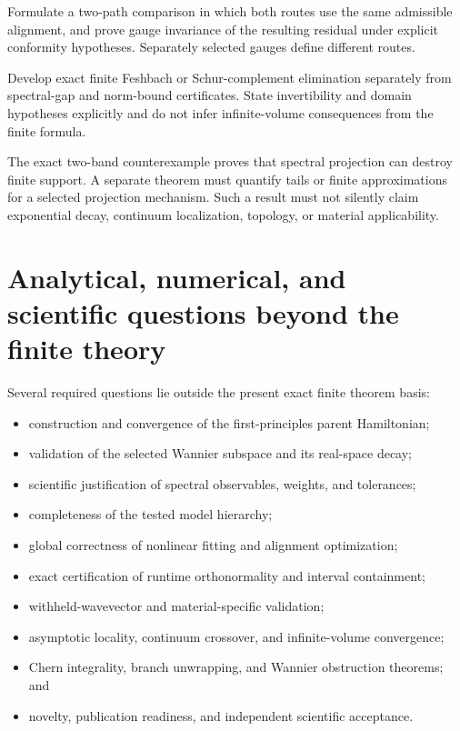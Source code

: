 \begin{openproblem}
Formulate a two-path comparison in which both routes use the same admissible alignment,
and prove gauge invariance of the resulting residual under explicit conformity
hypotheses.  Separately selected gauges define different routes.
\end{openproblem}

\begin{openproblem}
Develop exact finite Feshbach or Schur-complement elimination separately from
spectral-gap and norm-bound certificates.  State invertibility and domain hypotheses
explicitly and do not infer infinite-volume consequences from the finite formula.
\end{openproblem}

\begin{openproblem}
The exact two-band counterexample proves that spectral projection can destroy finite support.  A
separate theorem must quantify tails or finite approximations for a selected projection mechanism.
Such a result must not silently claim exponential decay, continuum localization, topology, or
material applicability.
\end{openproblem}

\section{Analytical, numerical, and scientific questions beyond the finite theory}

Several required questions lie outside the present exact finite theorem basis:

\begin{itemize}
  \item construction and convergence of the first-principles parent Hamiltonian;
  \item validation of the selected Wannier subspace and its real-space decay;
  \item scientific justification of spectral observables, weights, and tolerances;
  \item completeness of the tested model hierarchy;
  \item global correctness of nonlinear fitting and alignment optimization;
  \item exact certification of runtime orthonormality and interval containment;
  \item withheld-wavevector and material-specific validation;
  \item asymptotic locality, continuum crossover, and infinite-volume convergence;
  \item Chern integrality, branch unwrapping, and Wannier obstruction theorems; and
  \item novelty, publication readiness, and independent scientific acceptance.
\end{itemize}


